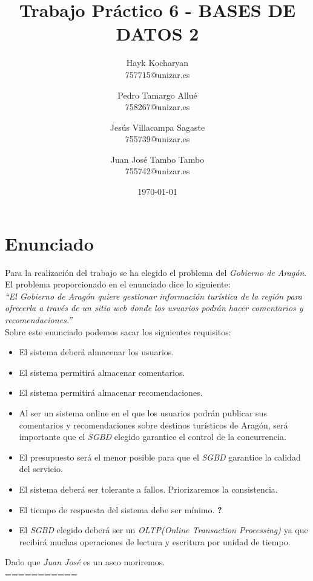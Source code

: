 \documentclass{article}
\title{Trabajo Práctico 6 - BASES DE DATOS 2}
\author{
  Hayk Kocharyan\\
  757715@unizar.es
  \and
  Pedro Tamargo Allué\\
  758267@unizar.es
  \and
  Jesús Villacampa Sagaste\\
  755739@unizar.es
  \and
  Juan José Tambo Tambo\\
  755742@unizar.es
}
\date{\today}
\begin{document}
\maketitle

%
\tableofcontents

\newpage 

\section{Enunciado}
Para la realización del trabajo se ha elegido el problema del \emph{Gobierno de Aragón}. El problema proporcionado en el enunciado dice lo siguiente:\\

\emph{``El Gobierno de Aragón quiere gestionar información turística de la región para ofrecerla a través de un sitio web donde los usuarios podrán hacer comentarios y recomendaciones.''}
\\

Sobre este enunciado podemos sacar los siguientes requisitos:
\begin{itemize}
\item El sistema deberá almacenar los usuarios.
\item El sistema permitirá almacenar comentarios.
\item El sistema permitirá almacenar recomendaciones.
\item Al ser un sistema online en el que los usuarios podrán publicar sus comentarios y recomendaciones sobre destinos turísticos de Aragón, será importante que el \emph{SGBD} elegido garantice el control de la concurrencia.
\item El presupuesto será el menor posible para que el \emph{SGBD} garantice la calidad del servicio.
\item El sistema deberá ser tolerante a fallos. Priorizaremos la consistencia.
\item El tiempo de respuesta del sistema debe ser mínimo. \textbf{?}
\item El \emph{SGBD} elegido deberá ser un \emph{OLTP(Online Transaction Processing)} ya que recibirá muchas operaciones de lectura y escritura por unidad de tiempo.
\end{itemize}

Dado que \emph{Juan José} es un asco moriremos.\\



===========\\
\end{document}
